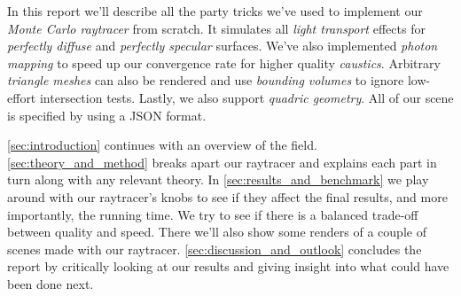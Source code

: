 \documentclass[a4paper, twocolumn]{article}
\begin{document}
        In this report we'll describe all the party tricks we've used to implement our \emph{Monte Carlo raytracer} from scratch. It simulates all \emph{light transport} effects for \emph{perfectly diffuse} and \emph{perfectly specular} surfaces. We've also implemented \emph{photon mapping} to speed up our convergence rate for higher quality \emph{caustics}. Arbitrary \emph{triangle meshes} can also be rendered and use \emph{bounding volumes} to ignore low-effort intersection tests. Lastly, we also support \emph{quadric geometry}. All of our scene is specified by using a JSON format.

        \cref{sec:introduction} continues with an overview of the field. \cref{sec:theory_and_method} breaks apart our raytracer and explains each part in turn along with any relevant theory. In \cref{sec:results_and_benchmark} we play around with our raytracer's knobs to see if they affect the final results, and more importantly, the running time. We try to see if there is a balanced trade-off between quality and speed. There we'll also show some renders of a couple of scenes made with our raytracer. \cref{sec:discussion_and_outlook} concludes the report by critically looking at our results and giving insight into what could have been done next.
\end{document}
